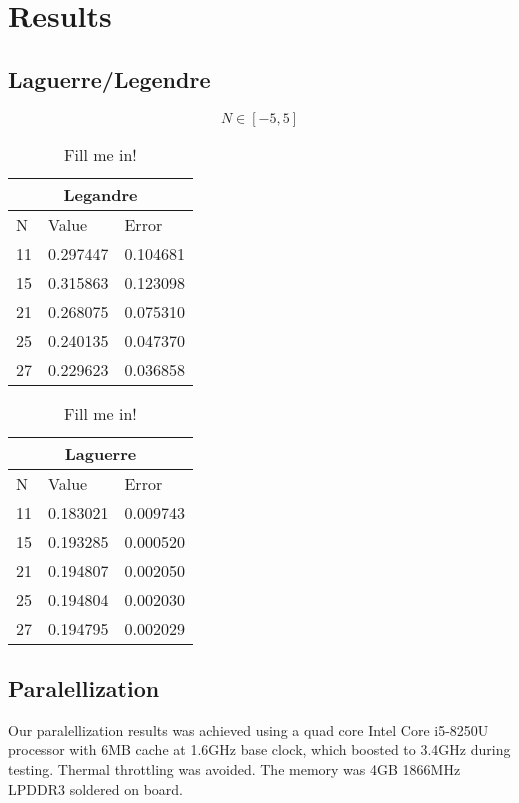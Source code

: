 \documentclass[../main.tex]{subfiles}
\begin{document}
\section{Results} \label{sec:results}
\subsection{Laguerre/Legendre} \label{sec:QMProbresults}


$$N \in [-5,5]$$
\begin{table}
  \begin{tabular}{ |p{1cm}|p{3cm}|p{3cm}|}
 \hline
 \multicolumn{3}{|c}{Legandre} \\
 \hline
       N   & Value & Error\\
 \hline
 11 & 0.297447 & 0.104681\\
 15 & 0.315863 & 0.123098\\
 21 & 0.268075 & 0.075310\\
 25 & 0.240135 & 0.047370\\
 27 & 0.229623 & 0.036858\\
 \hline
 \end{tabular}
 \caption{Fill me in!}
\end{table}

\begin{table}
\begin{tabular}{ |p{1cm}|p{3cm}|p{3cm}|}
 \hline
 \multicolumn{3}{|c}{Laguerre} \\
 \hline
       N   & Value & Error\\
 \hline
 11 &  0.183021 &  0.009743\\
 15 &  0.193285 &  0.000520\\
 21 &  0.194807 &  0.002050\\
 25 &  0.194804 &  0.002030\\
 27 &  0.194795 &  0.002029\\

 \hline
\end{tabular}
\caption{Fill me in!}
\end{table}

\FloatBarrier
\subsection{Paralellization} \label{sec:res-paralell}
Our paralellization results was achieved using a quad core Intel Core i5-8250U processor with 6MB cache at 1.6GHz base clock, which boosted to 3.4GHz during testing. Thermal throttling was avoided.
The memory was 4GB 1866MHz LPDDR3 soldered on board.
\end{document}
